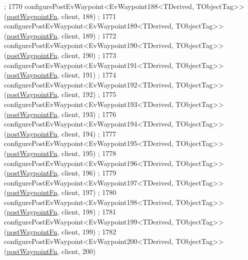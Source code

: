 \begin{DoxyCode}
      ;
1770     configurePostEvWaypoint<EvWaypoint188<TDerived, TObjectTag>>(\hyperlink{classmove__base__z__client_1_1WaypointEventDispatcher_acc538eb7506c13f7cca2268a1742dadd}{postWaypointFn}, client, 188)
      ;
1771     configurePostEvWaypoint<EvWaypoint189<TDerived, TObjectTag>>(\hyperlink{classmove__base__z__client_1_1WaypointEventDispatcher_acc538eb7506c13f7cca2268a1742dadd}{postWaypointFn}, client, 189)
      ;
1772     configurePostEvWaypoint<EvWaypoint190<TDerived, TObjectTag>>(\hyperlink{classmove__base__z__client_1_1WaypointEventDispatcher_acc538eb7506c13f7cca2268a1742dadd}{postWaypointFn}, client, 190)
      ;
1773     configurePostEvWaypoint<EvWaypoint191<TDerived, TObjectTag>>(\hyperlink{classmove__base__z__client_1_1WaypointEventDispatcher_acc538eb7506c13f7cca2268a1742dadd}{postWaypointFn}, client, 191)
      ;
1774     configurePostEvWaypoint<EvWaypoint192<TDerived, TObjectTag>>(\hyperlink{classmove__base__z__client_1_1WaypointEventDispatcher_acc538eb7506c13f7cca2268a1742dadd}{postWaypointFn}, client, 192)
      ;
1775     configurePostEvWaypoint<EvWaypoint193<TDerived, TObjectTag>>(\hyperlink{classmove__base__z__client_1_1WaypointEventDispatcher_acc538eb7506c13f7cca2268a1742dadd}{postWaypointFn}, client, 193)
      ;
1776     configurePostEvWaypoint<EvWaypoint194<TDerived, TObjectTag>>(\hyperlink{classmove__base__z__client_1_1WaypointEventDispatcher_acc538eb7506c13f7cca2268a1742dadd}{postWaypointFn}, client, 194)
      ;
1777     configurePostEvWaypoint<EvWaypoint195<TDerived, TObjectTag>>(\hyperlink{classmove__base__z__client_1_1WaypointEventDispatcher_acc538eb7506c13f7cca2268a1742dadd}{postWaypointFn}, client, 195)
      ;
1778     configurePostEvWaypoint<EvWaypoint196<TDerived, TObjectTag>>(\hyperlink{classmove__base__z__client_1_1WaypointEventDispatcher_acc538eb7506c13f7cca2268a1742dadd}{postWaypointFn}, client, 196)
      ;
1779     configurePostEvWaypoint<EvWaypoint197<TDerived, TObjectTag>>(\hyperlink{classmove__base__z__client_1_1WaypointEventDispatcher_acc538eb7506c13f7cca2268a1742dadd}{postWaypointFn}, client, 197)
      ;
1780     configurePostEvWaypoint<EvWaypoint198<TDerived, TObjectTag>>(\hyperlink{classmove__base__z__client_1_1WaypointEventDispatcher_acc538eb7506c13f7cca2268a1742dadd}{postWaypointFn}, client, 198)
      ;
1781     configurePostEvWaypoint<EvWaypoint199<TDerived, TObjectTag>>(\hyperlink{classmove__base__z__client_1_1WaypointEventDispatcher_acc538eb7506c13f7cca2268a1742dadd}{postWaypointFn}, client, 199)
      ;
1782     configurePostEvWaypoint<EvWaypoint200<TDerived, TObjectTag>>(\hyperlink{classmove__base__z__client_1_1WaypointEventDispatcher_acc538eb7506c13f7cca2268a1742dadd}{postWaypointFn}, client, 200)

\end{DoxyCode}
